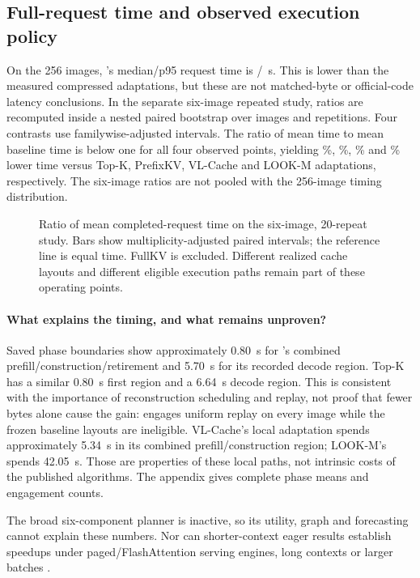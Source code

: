 \subsection{Full-request time and observed execution policy}
\label{sec:latency}
On the 256 images, \Evi{}'s median/p95 request time is
\EviMedian/\EviTail~s. This is lower than the measured compressed adaptations,
but these are not matched-byte or official-code latency conclusions.
In the separate six-image repeated study, ratios are recomputed inside a
nested paired bootstrap over images and repetitions. Four contrasts use
familywise-adjusted intervals. The ratio of mean \Evi{} time to mean
baseline time is below one for all four observed points, yielding
\TopFaster\%, \PrefixFaster\%, \VLFaster\% and \LookFaster\% lower time
versus Top-K, PrefixKV, VL-Cache and LOOK-M adaptations, respectively.
The six-image ratios are not pooled with the 256-image timing distribution.

\begin{figure}[t]
\centering
\caption{Ratio of mean completed-request time on the six-image, 20-repeat
study. Bars show multiplicity-adjusted paired intervals; the reference line
is equal time. FullKV is excluded. Different realized cache layouts and
different eligible execution paths remain part of these operating points.}
\label{fig:latency}
\end{figure}

\paragraph{What explains the timing, and what remains unproven?}
Saved phase boundaries show approximately 0.80~s for \Evi{}'s combined
prefill/construction/retirement and 5.70~s for its recorded decode region.
Top-K has a similar 0.80~s first region and a 6.64~s decode region. This is
consistent with the importance of reconstruction scheduling and replay,
not proof that fewer bytes alone cause the gain: \Evi{} engages uniform
replay on every image while the frozen baseline layouts are ineligible.
VL-Cache's local adaptation spends approximately 5.34~s in its combined
prefill/construction region; LOOK-M's spends 42.05~s. Those are properties
of these local paths, not intrinsic costs of the published algorithms.
The appendix gives complete phase means and engagement counts.

The broad six-component planner is inactive, so its utility, graph and
forecasting cannot explain these numbers. Nor can shorter-context eager
results establish speedups under paged/FlashAttention serving engines,
long contexts or larger batches \citep{dao2022flashattention,kwon2023paged}.
